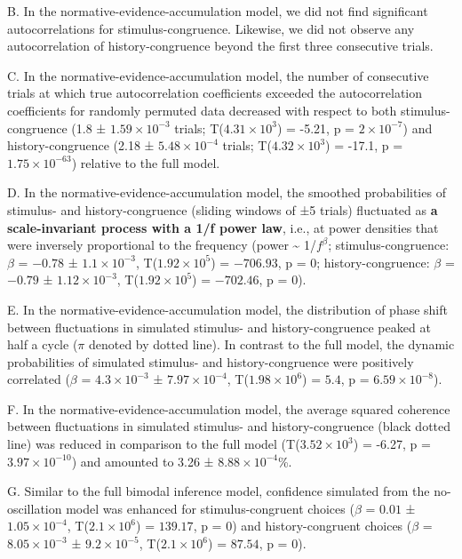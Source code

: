 \documentclass[
]{article}
\begin{document}
B. In the normative-evidence-accumulation model, we did not find
significant autocorrelations for stimulus-congruence. Likewise, we did
not observe any autocorrelation of history-congruence beyond the first
three consecutive trials.

C. In the normative-evidence-accumulation model, the number of
consecutive trials at which true autocorrelation coefficients exceeded
the autocorrelation coefficients for randomly permuted data decreased
with respect to both stimulus-congruence (1.8 ±
\ensuremath{1.59\times 10^{-3}} trials;
T(\ensuremath{4.31\times 10^{3}}) = -5.21, p =
\(\ensuremath{2\times 10^{-7}}\)) and history-congruence (2.18 ±
\ensuremath{5.48\times 10^{-4}} trials;
T(\ensuremath{4.32\times 10^{3}}) = -17.1, p =
\(\ensuremath{1.75\times 10^{-63}}\)) relative to the full model.

D. In the normative-evidence-accumulation model, the smoothed
probabilities of stimulus- and history-congruence (sliding windows of ±5
trials) fluctuated as \textbf{a scale-invariant process with a 1/f power
law}, i.e., at power densities that were inversely proportional to the
frequency (power \textasciitilde{} 1/\(f^\beta\); stimulus-congruence:
\(\beta\) = \(-0.78\) ± \(\ensuremath{1.1\times 10^{-3}}\),
T(\(\ensuremath{1.92\times 10^{5}}\)) = \(-706.93\), p = \(0\);
history-congruence: \(\beta\) = \(-0.79\) ±
\(\ensuremath{1.12\times 10^{-3}}\),
T(\(\ensuremath{1.92\times 10^{5}}\)) = \(-702.46\), p = \(0\)).

E. In the normative-evidence-accumulation model, the distribution of
phase shift between fluctuations in simulated stimulus- and
history-congruence peaked at half a cycle (\(\pi\) denoted by dotted
line). In contrast to the full model, the dynamic probabilities of
simulated stimulus- and history-congruence were positively correlated
(\(\beta\) = \(\ensuremath{4.3\times 10^{-3}}\) ±
\(\ensuremath{7.97\times 10^{-4}}\),
T(\(\ensuremath{1.98\times 10^{6}}\)) = \(5.4\), p =
\(\ensuremath{6.59\times 10^{-8}}\)).

F. In the normative-evidence-accumulation model, the average squared
coherence between fluctuations in simulated stimulus- and
history-congruence (black dotted line) was reduced in comparison to the
full model (T(\ensuremath{3.52\times 10^{3}}) = -6.27, p =
\(\ensuremath{3.97\times 10^{-10}}\)) and amounted to 3.26 ±
\ensuremath{8.88\times 10^{-4}}\%.

G. Similar to the full bimodal inference model, confidence simulated
from the no-oscillation model was enhanced for stimulus-congruent
choices (\(\beta\) = \(0.01\) ± \(\ensuremath{1.05\times 10^{-4}}\),
T(\(\ensuremath{2.1\times 10^{6}}\)) = \(139.17\), p = \(0\)) and
history-congruent choices (\(\beta\) =
\(\ensuremath{8.05\times 10^{-3}}\) ±
\(\ensuremath{9.2\times 10^{-5}}\), T(\(\ensuremath{2.1\times 10^{6}}\))
= \(87.54\), p = \(0\)).
\end{document}
